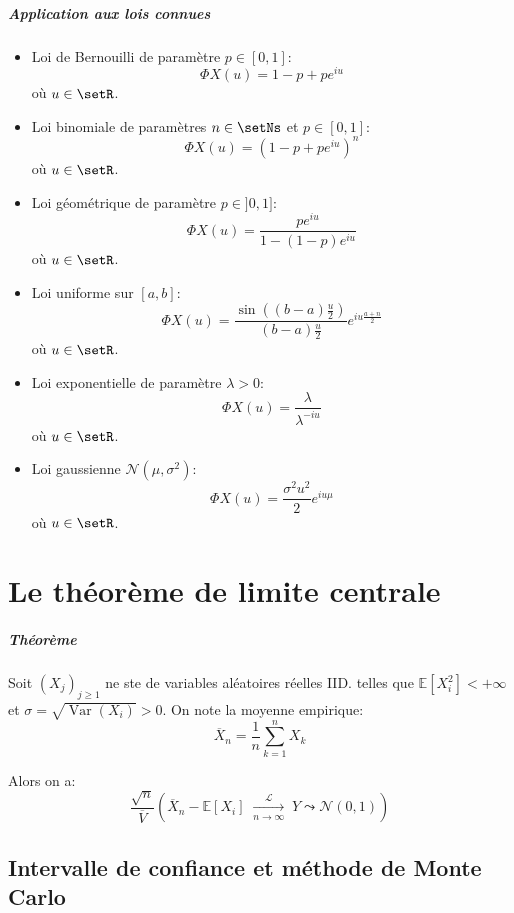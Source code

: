 \documentclass[a4paper,10pt,french,openany]{memoir}
\newcommand{\Esper}{\mathbb{E}}
\newcommand{\normale}{\mathcal{N}}
\DeclareMathOperator{\Var}{Var}
\begin{document}
\paragraph{Application aux lois connues}
\begin{itemize}
 \item Loi de Bernouilli de paramètre $p\in[0,1]$:
 \[ \Phi X(u) = 1-p+pe^{iu} \] où $u\in\setR$.
 
 \item Loi binomiale de paramètres $n\in\setNs$ et $p\in[0,1]$:
 \[ \Phi X(u) = (1-p + pe^{iu})^n \] où $u\in\setR$.
 
 \item Loi géométrique de paramètre $p\in]0,1]$:
 \[ \Phi X(u) = \frac{pe^{iu}}{1-(1-p)e^{iu}} \] où $u\in\setR$.
 
 \item Loi uniforme sur $[a,b]$:
 \[ \Phi X(u) = \frac{\sin((b-a)\frac u 2)}{(b-a)\frac u 2} e^{iu \frac{a+n}2} \] où $u\in\setR$.
 
 \item Loi exponentielle de paramètre $\lambda>0$:
 \[ \Phi X(u) = \frac \lambda {\lambda^{-iu}} \] où $u\in\setR$.
 
 \item Loi gaussienne $\normale(\mu, \sigma^2)$:
 \[ \Phi X(u) = \frac{\sigma^2 u^2}2 e^{iu\mu} \] où $u\in\setR$.
\end{itemize}

\chapter{Le théorème de limite centrale}

\paragraph{Théorème}
Soit $(X_j)_{j\geq1}$ ne ste de variables aléatoires réelles IID. telles que $\Esper[X_i^2]<+\infty$ et $\sigma=\sqrt{\Var(X_i)} > 0$. On note la moyenne empirique: \[\overline X_n = \frac1n \sum_{k=1}^n X_k\]

Alors on a:
\[\frac{\sqrt n}{\overline V} \left(\overline X_n - \Esper[X_i]\; \underset{n\to\infty}{\overset{\mathcal{L}}\to} \;Y \leadsto \normale(0, 1)\right)\]

\section{Intervalle de confiance et méthode de Monte Carlo}
\end{document}
